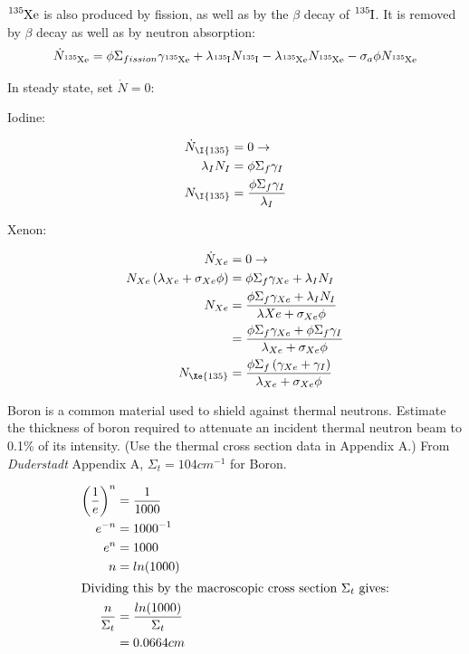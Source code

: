 \documentclass{hw}
\begin{document}
	$\ce{^{135}Xe}$ is also produced by fission, as well as by the $\beta$ decay of $\ce{^{135}I}$. It is removed by $\beta$ decay as well as by neutron absorption:
	\[ \dot{N}_{\ce{^{135}Xe}} = \phi\Sigma_{fission}\gamma_{\ce{^{135}Xe}}+\lambda_{\ce{^{135}I}}N_{\ce{^{135}I}}-\lambda_{\ce{^{135}Xe}}N_{\ce{^{135}Xe}}-\sigma_{a} \phi N_{\ce{^{135}Xe}} \]

	In steady state, set $ \dot{N} = 0 $:

	Iodine:

	\begin{align*}
		\dot{N}_{\I{135}} &= 0 \rightarrow \\ 
		\lambda_I N_I &= \phi \Sigma_f \gamma_I \\
		N_{\I{135}} &= \frac{\phi \Sigma_f \gamma_I}{\lambda_I}
	\end{align*}

	Xenon:

	\begin{align*}
		\dot{N}_{Xe} &= 0 \rightarrow \\ 
		N_{Xe} \left( \lambda_{Xe} + \sigma_{Xe} \phi \right)&= \phi \Sigma_f \gamma_{Xe} + \lambda_I N_I  \\
		N_{Xe} &= \frac{\phi \Sigma_f \gamma_{Xe} + \lambda_I N_I}{\lambda{Xe} + \sigma_{Xe} \phi} \\
		&= \frac{\phi \Sigma_f \gamma_{Xe} + \phi \Sigma_f \gamma_I}{\lambda_{Xe} + \sigma_{Xe} \phi} \\
		N_{\Xe{135}} &= \frac{\phi \Sigma_f \left( \gamma_{Xe} + \gamma_I \right)}{\lambda_{Xe} + \sigma_{Xe} \phi}
	\end{align*}

	Boron is a common material used to shield against thermal neutrons. Estimate the thickness of boron required to attenuate an incident thermal neutron beam to 0.1\% of its intensity. (Use the thermal cross section data in Appendix A.)
\solution
	From \textit{Duderstadt} Appendix A, $ \Sigma_t = 104cm^{-1}$ for Boron.
	
	\begin{align*}
		\left(\frac{1}{e}\right)^n &= \frac{1}{1000} \\
		e^{-n} &= 1000^{-1} \\
		e^n &= 1000 \\
		n &= ln(1000) \\
		\intertext{Dividing this by the macroscopic cross section $ \Sigma_t $ gives:}
		\frac{n}{\Sigma_t} &= \frac{ln(1000)}{\Sigma_t} \\
		&= 0.0664 cm
	\end{align*}
\end{document}

